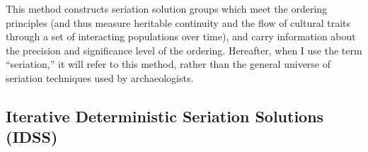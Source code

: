This method constructs seriation solution groups which meet the ordering principles (and thus measure heritable continuity and the flow of cultural traits through a set of interacting populations over time), and carry information about the precision and significance level of the ordering.  Hereafter, when I use the term ``seriation,'' it will refer to this method, rather than the general universe of seriation techniques used by archaeologists.  

\subsection{Iterative Deterministic Seriation Solutions (IDSS)}
\label{sec:idss-seriation}

